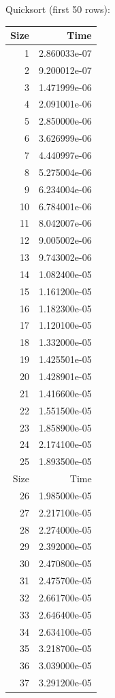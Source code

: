 \documentclass[letterpaper, 11pt]{article}
\begin{document}
Quicksort (first 50 rows):
\begin{longtable}{rr}
 Size &          Time \\
\hline
    1 &  2.860033e-07 \\
    2 &  9.200012e-07 \\
    3 &  1.471999e-06 \\
    4 &  2.091001e-06 \\
    5 &  2.850000e-06 \\
    6 &  3.626999e-06 \\
    7 &  4.440997e-06 \\
    8 &  5.275004e-06 \\
    9 &  6.234004e-06 \\
   10 &  6.784001e-06 \\
   11 &  8.042007e-06 \\
   12 &  9.005002e-06 \\
   13 &  9.743002e-06 \\
   14 &  1.082400e-05 \\
   15 &  1.161200e-05 \\
   16 &  1.182300e-05 \\
   17 &  1.120100e-05 \\
   18 &  1.332000e-05 \\
   19 &  1.425501e-05 \\
   20 &  1.428901e-05 \\
   21 &  1.416600e-05 \\
   22 &  1.551500e-05 \\
   23 &  1.858900e-05 \\
   24 &  2.174100e-05 \\
   25 &  1.893500e-05 \\
 Size &          Time \\
\hline
   26 &  1.985000e-05 \\
   27 &  2.217100e-05 \\
   28 &  2.274000e-05 \\
   29 &  2.392000e-05 \\
   30 &  2.470800e-05 \\
   31 &  2.475700e-05 \\
   32 &  2.661700e-05 \\
   33 &  2.646400e-05 \\
   34 &  2.634100e-05 \\
   35 &  3.218700e-05 \\
   36 &  3.039000e-05 \\
   37 &  3.291200e-05 \\

\end{longtable}
\end{document}
